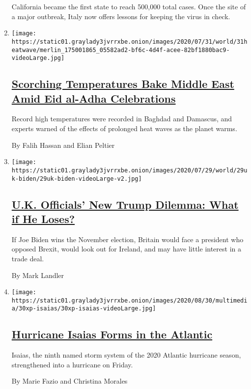 \begin{enumerate}
  California became the first state to reach 500,000 total cases. Once
  the site of a major outbreak, Italy now offers lessons for keeping the
  virus in check.
\item
  \texttt{[image: https://static01.graylady3jvrrxbe.onion/images/2020/07/31/world/31heatwave/merlin\_175001865\_05582ad2-bf6c-4d4f-acee-82bf1880bac9-videoLarge.jpg]}

  \hypertarget{scorching-temperatures-bake-middle-east-amid-eid-al-adha-celebrations}{%
  \subsection{\texorpdfstring{\href{/2020/07/31/world/middleeast/Middle-East-heat-wave.html}{Scorching
  Temperatures Bake Middle East Amid Eid al-Adha
  Celebrations}}{Scorching Temperatures Bake Middle East Amid Eid al-Adha Celebrations}}\label{scorching-temperatures-bake-middle-east-amid-eid-al-adha-celebrations}}

  Record high temperatures were recorded in Baghdad and Damascus, and
  experts warned of the effects of prolonged heat waves as the planet
  warms.

  By Falih Hassan and Elian Peltier
\item
  \texttt{[image: https://static01.graylady3jvrrxbe.onion/images/2020/07/29/world/29uk-biden/29uk-biden-videoLarge-v2.jpg]}

  \hypertarget{uk-officials-new-trump-dilemma-what-if-he-loses}{%
  \subsection{\texorpdfstring{\href{/2020/07/31/world/europe/britain-biden-presidency-johnson.html}{U.K.
  Officials' New Trump Dilemma: What if He
  Loses?}}{U.K. Officials' New Trump Dilemma: What if He Loses?}}\label{uk-officials-new-trump-dilemma-what-if-he-loses}}

  If Joe Biden wins the November election, Britain would face a
  president who opposed Brexit, would look out for Ireland, and may have
  little interest in a trade deal.

  By Mark Landler
\item
  \texttt{[image: https://static01.graylady3jvrrxbe.onion/images/2020/08/30/multimedia/30xp-isaias/30xp-isaias-videoLarge.jpg]}

  \hypertarget{hurricane-isaias-forms-in-the-atlantic}{%
  \subsection{\texorpdfstring{\href{/2020/07/30/us/tropical-storm-isaias.html}{Hurricane
  Isaias Forms in the
  Atlantic}}{Hurricane Isaias Forms in the Atlantic}}\label{hurricane-isaias-forms-in-the-atlantic}}

  Isaias, the ninth named storm system of the 2020 Atlantic hurricane
  season, strengthened into a hurricane on Friday.

  By Marie Fazio and Christina Morales
\end{enumerate}

